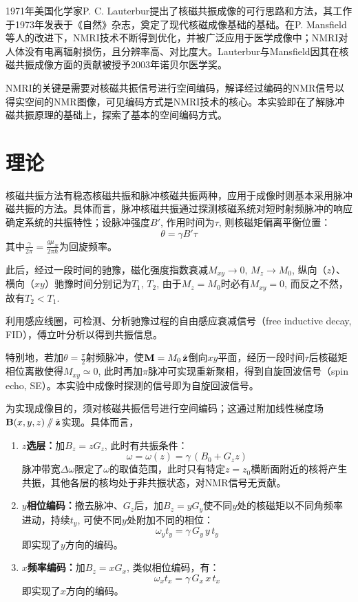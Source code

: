 \documentclass[aps,pre,12pt,preprint,%
	onecolumn,showpacs,showkeys,nofootinbib]{revtex4-1}
\begin{document}
	1971年美国化学家P. C. Lauterbur提出了核磁共振成像的可行思路和方法，其工作 \cite{lauterbur1973image} 于1973年发表于《自然》杂志，奠定了现代核磁成像基础的基础。在P. Mansfield等人的改进下，NMRI技术不断得到优化，并被广泛应用于医学成像中；NMRI对人体没有电离辐射损伤，且分辨率高、对比度大。Lauterbur与Mansfield因其在核磁共振成像方面的贡献被授予2003年诺贝尔医学奖。
	
	NMRI的关键是需要对核磁共振信号进行空间编码，解译经过编码的NMR信号以得实空间的NMR图像，可见编码方式是NMRI技术的核心。本实验即在了解脉冲磁共振原理的基础上，探索了基本的空间编码方式。
\vspace{-2ex}
\section{理论}
\vspace{-1ex}
	核磁共振方法有稳态核磁共振和脉冲核磁共振两种，应用于成像时则基本采用脉冲磁共振的方法。具体而言，脉冲核磁共振通过探测核磁系统对短时射频脉冲的响应确定系统的共振特性；设脉冲强度$B'$, 作用时间为$\tau$, 则核磁矩偏离平衡位置：
	\begin{equation}
		\theta = \gamma B'\tau
	\end{equation}
	其中$\frac{\gamma}{2\pi} = \frac{g\mu_N}{2\pi\hbar}$为回旋频率。
	
	此后，经过一段时间的驰豫，磁化强度指数衰减$M_{xy}\to 0,\,M_z\to M_0$, 纵向（$z$）、横向（$xy$）驰豫时间分别记为$T_1,\,T_2$, 由于$M_z = M_0$时必有$M_{xy} = 0$, 而反之不然，故有$T_2 < T_1$. 
\clearpage
	
	利用感应线圈，可检测、分析驰豫过程的自由感应衰减信号（free inductive decay, FID），傅立叶分析以得到共振信息。
	
	特别地，若加$\theta = \frac{\pi}{2}$射频脉冲，使$\vb{M} = M_0\,\hat{\vb{z}}$倒向$xy$平面，经历一段时间$\tau$后核磁矩相位离散使得$M_{xy} \simeq 0$, 此时再加$\pi$脉冲可实现重新聚相，得到自旋回波信号（spin echo, SE）。本实验中成像时探测的信号即为自旋回波信号。
	
	为实现成像目的，须对核磁共振信号进行空间编码；这通过附加线性梯度场$\vb{B}(x,y,z) \sslash \hat{\vb{z}}$实现。具体而言，
	\begin{enumerate}[label=\arabic*.]
	\item \textbf{$z$选层：}加$B_z = zG_z$, 此时有共振条件：
	\begin{equation}
		\omega = \omega(z) = \gamma\,(B_0 + G_z z)
	\end{equation}
	脉冲带宽$\Delta\omega$限定了$\omega$的取值范围，此时只有特定$z = z_0$横断面附近的核将产生共振，其他各层的核均处于非共振状态，对NMR信号无贡献。
	\item \textbf{$y$相位编码：}撤去脉冲、$G_z$后，加$B_z = yG_y$使不同$y$处的核磁矩以不同角频率进动，持续$t_y$, 可使不同$y$处附加不同的相位：
	\begin{equation}
		\omega_y t_y = \gamma\,G_y\,y\,t_y
	\end{equation}
	即实现了$y$方向的编码。
	\item \textbf{$x$频率编码：}加$B_z = xG_x$, 类似相位编码，有：
	\begin{equation}
		\omega_x t_x = \gamma\,G_x\,x\,t_x
	\end{equation}
	即实现了$x$方向的编码。
	\end{enumerate}
	
\end{document}
